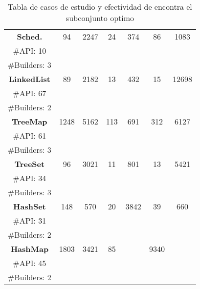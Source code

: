 \begin{table}[H]
\begin{tabular}{cccccccc}
\midrule
\multicolumn{2}{c}{\textbf{Sched.}} &   94& 2247  & 24  & 374  & 86  &1083    \\
\multicolumn{2}{c}{\tiny \#API: 10} &  &   & &   & & \\
\multicolumn{2}{c}{\tiny \#Builders: 3} &  &   & &   & & \\
\midrule
\multicolumn{2}{c}{\textbf{LinkedList}} & 89 &  2182 &  13 &  432 & 15 &  12698  \\
\multicolumn{2}{c}{\tiny \#API: 67} &  &   & &   & & \\
\multicolumn{2}{c}{\tiny \#Builders: 2} &  &   & &   & & \\
\midrule
\multicolumn{2}{c}{\textbf{TreeMap}} & 1248  &  5162 &  113 & 691  & 312  &   6127  \\
\multicolumn{2}{c}{\tiny \#API: 61} &  &   & &   & & \\
\multicolumn{2}{c}{\tiny \#Builders: 3} &  &   & &   & & \\
\midrule
\multicolumn{2}{c}{\textbf{TreeSet}} &  96 & 3021  &  11 & 801  &  13 &  5421  \\
\multicolumn{2}{c}{\tiny \#API: 34} &  &   & &   & & \\
\multicolumn{2}{c}{\tiny \#Builders: 3} &  &   & &   & & \\
\midrule
\multicolumn{2}{c}{\textbf{HashSet}} &  148 &  570 & 20  &  3842 &  39 &   660 \\
\multicolumn{2}{c}{\tiny \#API: 31} &  &   & &   & & \\
\multicolumn{2}{c}{\tiny \#Builders: 2} &  &   & &   & & \\
\midrule
\multicolumn{2}{c}{\textbf{HashMap}} &  1803 &  3421 &  85 &   &   9340&    \\
\multicolumn{2}{c}{\tiny \#API: 45} &  &   & &   & & \\
\multicolumn{2}{c}{\tiny \#Builders: 2} &  &   & &   & & \\
\hline
\end{tabular}

\caption{Tabla de casos de estudio y efectividad de encontra el subconjunto optimo}
\label{tab:eficiencia}
\end{table}

